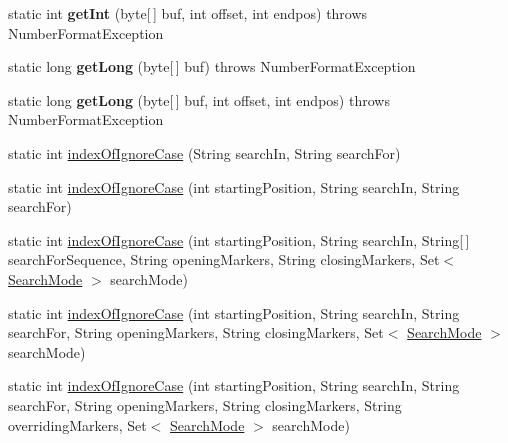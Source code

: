 \begin{DoxyCompactItemize}
\item 
\mbox{\label{classcom_1_1mysql_1_1cj_1_1util_1_1_string_utils_a7be255e52788a8f7548ef0f4f56b526b}} 
static int {\bfseries get\+Int} (byte\mbox{[}$\,$\mbox{]} buf, int offset, int endpos)  throws Number\+Format\+Exception 
\item 
\mbox{\label{classcom_1_1mysql_1_1cj_1_1util_1_1_string_utils_a45f323c1f54d962e1c10eb8aa13b1726}} 
static long {\bfseries get\+Long} (byte\mbox{[}$\,$\mbox{]} buf)  throws Number\+Format\+Exception 
\item 
\mbox{\label{classcom_1_1mysql_1_1cj_1_1util_1_1_string_utils_a6d481f0c625a7ecd3642b152a6388170}} 
static long {\bfseries get\+Long} (byte\mbox{[}$\,$\mbox{]} buf, int offset, int endpos)  throws Number\+Format\+Exception 
\item 
static int \mbox{\hyperlink{classcom_1_1mysql_1_1cj_1_1util_1_1_string_utils_a04e388c77ef24c2d95cdc76b3aef7be9}{index\+Of\+Ignore\+Case}} (String search\+In, String search\+For)
\item 
static int \mbox{\hyperlink{classcom_1_1mysql_1_1cj_1_1util_1_1_string_utils_a716494cab67842271dd23a566f2c493a}{index\+Of\+Ignore\+Case}} (int starting\+Position, String search\+In, String search\+For)
\item 
static int \mbox{\hyperlink{classcom_1_1mysql_1_1cj_1_1util_1_1_string_utils_a480991db62742c024fad125ac564d71f}{index\+Of\+Ignore\+Case}} (int starting\+Position, String search\+In, String\mbox{[}$\,$\mbox{]} search\+For\+Sequence, String opening\+Markers, String closing\+Markers, Set$<$ \mbox{\hyperlink{enumcom_1_1mysql_1_1cj_1_1util_1_1_string_utils_1_1_search_mode}{Search\+Mode}} $>$ search\+Mode)
\item 
static int \mbox{\hyperlink{classcom_1_1mysql_1_1cj_1_1util_1_1_string_utils_a77e89331060e523af4da7475368b0dea}{index\+Of\+Ignore\+Case}} (int starting\+Position, String search\+In, String search\+For, String opening\+Markers, String closing\+Markers, Set$<$ \mbox{\hyperlink{enumcom_1_1mysql_1_1cj_1_1util_1_1_string_utils_1_1_search_mode}{Search\+Mode}} $>$ search\+Mode)
\item 
static int \mbox{\hyperlink{classcom_1_1mysql_1_1cj_1_1util_1_1_string_utils_a50cacf56ea5db76e3094200748dda145}{index\+Of\+Ignore\+Case}} (int starting\+Position, String search\+In, String search\+For, String opening\+Markers, String closing\+Markers, String overriding\+Markers, Set$<$ \mbox{\hyperlink{enumcom_1_1mysql_1_1cj_1_1util_1_1_string_utils_1_1_search_mode}{Search\+Mode}} $>$ search\+Mode)

\end{DoxyCompactItemize}
